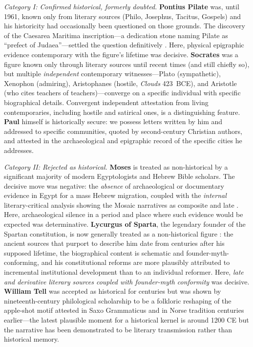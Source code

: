 \documentclass[12pt,oneside]{article}
\begin{document}
\textit{Category I: Confirmed historical, formerly doubted.}
\textbf{Pontius Pilate} was, until 1961, known only from literary
sources (Philo, Josephus, Tacitus, Gospels) and his historicity had
occasionally been questioned on those grounds.  The discovery of the
Caesarea Maritima inscription---a dedication stone naming Pilate as
``prefect of Judaea''---settled the question definitively
\citep{Vardaman1962}.  Here, physical epigraphic evidence
contemporary with the figure's lifetime was decisive.
\textbf{Socrates} was a figure known only through literary sources
until recent times (and still chiefly so), but multiple
\textit{independent} contemporary witnesses---Plato (sympathetic),
Xenophon (admiring), Aristophanes (hostile, \textit{Clouds} 423~BCE),
and Aristotle (who cites teachers of teachers)---converge on a
specific individual with specific biographical details.  Convergent
independent attestation from living contemporaries, including hostile
and satirical ones, is a distinguishing feature.
\textbf{Paul} himself is historically secure: we possess letters
written by him and addressed to specific communities, quoted by
second-century Christian authors, and attested in the archaeological
and epigraphic record of the specific cities he addresses.

\textit{Category II: Rejected as historical.}
\textbf{Moses} is treated as non-historical by a significant majority
of modern Egyptologists and Hebrew Bible scholars.  The decisive move
was negative: the \textit{absence} of archaeological or documentary
evidence in Egypt for a mass Hebrew migration, coupled with the
\textit{internal} literary-critical analysis showing the Mosaic
narratives as composite and late
\citep{FinkelsteinSilberman2001,ThompsonTL1999,Dever2003}.
Here, archaeological silence in a period and place where such
evidence would be expected was determinative.
\textbf{Lycurgus of Sparta}, the legendary founder of the Spartan
constitution, is now generally treated as a non-historical figure
\citep{Cartledge2001}: the ancient sources that purport to describe
him date from centuries after his supposed lifetime, the
biographical content is schematic and founder-myth-conforming, and
his constitutional reforms are more plausibly attributed to
incremental institutional development than to an individual reformer.
Here, \textit{late and derivative literary sources coupled with
founder-myth conformity} was decisive.
\textbf{William Tell} was accepted as historical for centuries but
was shown by nineteenth-century philological scholarship to be a
folkloric reshaping of the apple-shot motif attested in Saxo
Grammaticus and in Norse tradition centuries earlier---the latest
plausible moment for a historical kernel is around 1200 CE but the
narrative has been demonstrated to be literary transmission rather
than historical memory.
\end{document}
